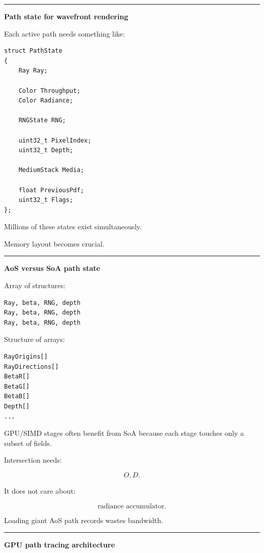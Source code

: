 \begin{center}\rule{0.5\linewidth}{0.5pt}\end{center}

\textbf{Path state for wavefront rendering}

Each active path needs something like:

\begin{verbatim}
struct PathState
{
    Ray Ray;

    Color Throughput;
    Color Radiance;

    RNGState RNG;

    uint32_t PixelIndex;
    uint32_t Depth;

    MediumStack Media;

    float PreviousPdf;
    uint32_t Flags;
};
\end{verbatim}

Millions of these states exist simultaneously.

Memory layout becomes crucial.

\begin{center}\rule{0.5\linewidth}{0.5pt}\end{center}

\textbf{AoS versus SoA path state}

Array of structures:

\begin{verbatim}
Ray, beta, RNG, depth
Ray, beta, RNG, depth
Ray, beta, RNG, depth
\end{verbatim}

Structure of arrays:

\begin{verbatim}
RayOrigins[]
RayDirections[]
BetaR[]
BetaG[]
BetaB[]
Depth[]
...
\end{verbatim}

GPU/SIMD stages often benefit from SoA because each stage touches only a subset of fields.

Intersection needs:

\[
O,D.
\]

It does not care about:

\[
\text{radiance accumulator}.
\]

Loading giant AoS path records wastes bandwidth.

\begin{center}\rule{0.5\linewidth}{0.5pt}\end{center}

\textbf{GPU path tracing architecture}

